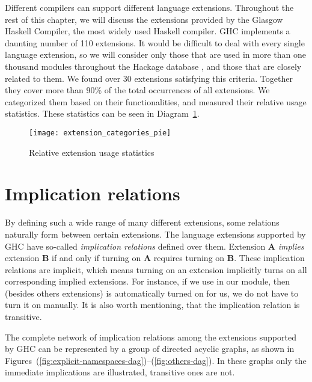 \documentclass[main.tex]{subfiles}
\begin{document}
	
	
	Different compilers can support different language extensions. Throughout the rest of this chapter, we will discuss the extensions provided by the Glasgow Haskell Compiler, the most widely used Haskell compiler. GHC implements a daunting number of 110 extensions. It would be difficult to deal with every single language extension, so we will consider only those that are used in more than one thousand modules throughout the Hackage database \cite{hackage-bib}, and those that are closely related to them. We found over 30 extensions satisfying this criteria. Together they cover more than 90\% of the total occurrences of all extensions. We categorized them based on their functionalities, and measured their relative usage statistics. These statistics can be seen in Diagram~\ref{fig:rel-ext-piechart}.
	
	\begin{figure}[h]
		\renewcommand{\figurename}{Diagram}
		\hspace{-1cm}
		\centering
		\caption{Relative extension usage statistics}
		\texttt{[image: extension\_categories\_pie]}
		\label{fig:rel-ext-piechart}
	\end{figure}
		
	\section{Implication relations}
	
	By defining such a wide range of many different extensions, some relations naturally form between certain extensions. The language extensions supported by GHC have so-called \emph{implication relations} defined over them. Extension \textbf{A} \emph{implies} extension \textbf{B} if and only if turning on \textbf{A} requires turning on \textbf{B}. These implication relations are implicit, which means turning on an extension implicitly turns on all corresponding implied extensions. For instance, if we use  in our module, then (besides others extensions)  is automatically turned on for us, we do not have to turn it on manually. It is also worth mentioning, that the implication relation is transitive.
	
	The complete network of implication relations among the extensions supported by GHC can be represented by a group of directed acyclic graphs, as shown in Figures~(\ref{fig:explicit-namespaces-dag})--(\ref{fig:others-dag}). In these graphs only the immediate implications are illustrated, transitive ones are not.
	
\end{document}
